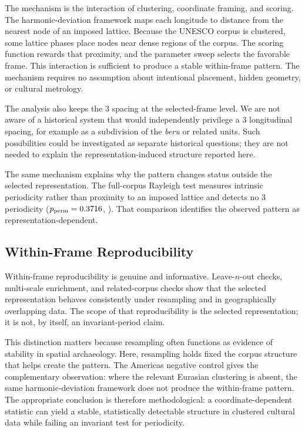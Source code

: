 \documentclass[12pt,a4paper]{article}
\begin{document}
The mechanism is the interaction of clustering, coordinate framing, and
scoring. The harmonic-deviation framework maps each longitude to distance from
the nearest node of an imposed lattice. Because the UNESCO corpus is clustered,
some lattice phases place nodes near dense regions of the corpus. The scoring
function rewards that proximity, and the parameter sweep selects the favorable
frame. This interaction is sufficient to produce a stable within-frame
pattern. The mechanism requires no assumption about intentional placement,
hidden geometry, or cultural metrology.

The analysis also keeps the 3\textdegree{} spacing at the selected-frame
level. We are not aware of a historical system that would independently
privilege a 3\textdegree{} longitudinal spacing, for example as a subdivision
of the \textit{beru} or related units. Such possibilities could be
investigated as separate historical questions; they are not needed to explain
the representation-induced structure reported here.

The same mechanism explains why the pattern changes status outside the
selected representation. The full-corpus Rayleigh test measures intrinsic
periodicity rather than proximity to an imposed lattice and detects no
3\textdegree{} periodicity ($p_{\mathrm{perm}} = 0.3716$,
\fullRayleighPermPSig{}). That comparison identifies the observed pattern as
representation-dependent.

\subsection{Within-Frame Reproducibility}

Within-frame reproducibility is genuine and informative. Leave-$n$-out
checks, multi-scale enrichment, and related-corpus checks show that the
selected representation behaves consistently under resampling and in
geographically overlapping data. The scope of that reproducibility is the
selected representation; it is not, by itself, an invariant-period claim.

This distinction matters because resampling often functions as evidence of
stability in spatial archaeology. Here, resampling holds fixed the corpus
structure that helps create the pattern. The Americas negative control gives
the complementary observation: where the relevant Eurasian clustering is
absent, the same harmonic-deviation framework does not produce the
within-frame pattern. The appropriate conclusion is therefore methodological:
a coordinate-dependent statistic can yield a stable, statistically detectable
structure in clustered cultural data while failing an invariant test for
periodicity.
\end{document}
